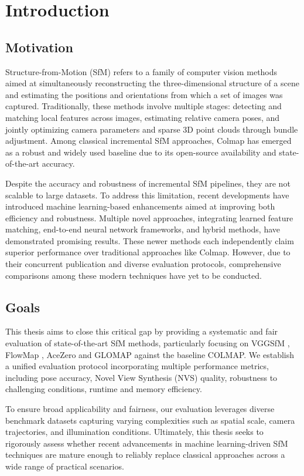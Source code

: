\chapter{Introduction}\label{chap:introduction}

\section{Motivation}

Structure-from-Motion (SfM) refers to a family of computer vision methods aimed at simultaneously reconstructing the three-dimensional structure of a scene and estimating the positions and orientations from which a set of images was captured. 
Traditionally, these methods involve multiple stages: detecting and matching local features across images, estimating relative camera poses, and jointly optimizing camera parameters and sparse 3D point clouds through bundle adjustment. 
Among classical incremental SfM approaches, Colmap \cite{schoenberger2016sfm} has emerged as a robust and widely used baseline due to its open-source availability and state-of-the-art accuracy.

Despite the accuracy and robustness of incremental SfM pipelines, they are not scalable to large datasets.
To address this limitation, recent developments have introduced machine learning-based enhancements aimed at improving both efficiency and robustness. 
Multiple novel approaches, integrating learned feature matching, end-to-end neural network frameworks, and hybrid methods, have demonstrated promising results. 
These newer methods each independently claim superior performance over traditional approaches like Colmap. However, due to their concurrent publication and diverse evaluation protocols, comprehensive comparisons among these modern techniques have yet to be conducted.

\section{Goals}

This thesis aims to close this critical gap by providing a systematic and fair evaluation of state-of-the-art SfM methods, particularly focusing on VGGSfM \cite{wang2023vggsfm}, FlowMap \cite{smith24flowmap}, AceZero \cite{brachmann2024acezero} and GLOMAP \cite{pan2024glomap} against the baseline COLMAP.
We establish a unified evaluation protocol incorporating multiple performance metrics, including pose accuracy, Novel View Synthesis (NVS) quality, robustness to challenging conditions, runtime and memory efficiency.

To ensure broad applicability and fairness, our evaluation leverages diverse benchmark datasets capturing varying complexities such as spatial scale, camera trajectories, and illumination conditions. 
Ultimately, this thesis seeks to rigorously assess whether recent advancements in machine learning-driven SfM techniques are mature enough to reliably replace classical approaches across a wide range of practical scenarios.
